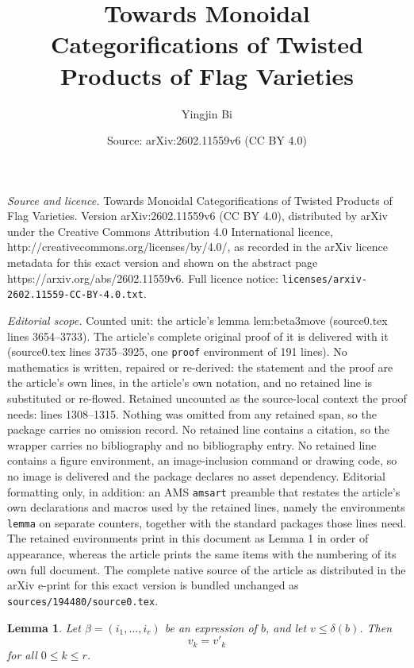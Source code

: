 \documentclass[10pt,a4paper]{amsart}
\title{Towards Monoidal Categorifications of Twisted Products of Flag Varieties}
\author{Yingjin Bi}
\date{Source: arXiv:2602.11559v6 (CC BY 4.0)}
\newtheorem{lemma}{Lemma}
\begin{document}
\maketitle

\noindent\emph{Source and licence.} Towards Monoidal Categorifications of Twisted Products of Flag Varieties. Version arXiv:2602.11559v6 (CC BY 4.0), distributed by arXiv under the Creative Commons Attribution 4.0 International licence, http://creativecommons.org/licenses/by/4.0/, as recorded in the arXiv licence metadata for this exact version and shown on the abstract page https://arxiv.org/abs/2602.11559v6. Full licence notice: \texttt{licenses/arxiv-2602.11559-CC-BY-4.0.txt}.\par\smallskip

\noindent\textit{Editorial scope.} Counted unit: the article's lemma lem:beta3move (source0.tex lines 3654--3733). The article's complete original proof of it is delivered with it (source0.tex lines 3735--3925, one \texttt{proof} environment of 191 lines). No mathematics is written, repaired or re-derived: the statement and the proof are the article's own lines, in the article's own notation, and no retained line is substituted or re-flowed.  Retained uncounted as the source-local context the proof needs: lines 1308--1315.  Nothing was omitted from any retained span, so the package carries no omission record.  No retained line contains a citation, so the wrapper carries no bibliography and no bibliography entry.  No retained line contains a figure environment, an image-inclusion command or drawing code, so no image is delivered and the package declares no asset dependency.  Editorial formatting only, in addition: an AMS \texttt{amsart} preamble that restates the article's own declarations and macros used by the retained lines, namely the environments \texttt{lemma} on separate counters, together with the standard packages those lines need.  The retained environments print in this document as Lemma 1 in order of appearance, whereas the article prints the same items with the numbering of its own full document.  The complete native source of the article as distributed in the arXiv e-print for this exact version is bundled unchanged as \texttt{sources/194480/source0.tex}.
\begin{lemma}\label{lem:vk}
Let \(\beta=(i_1,\dots,i_r)\) be an expression of \(b\), and let
\(v\le \delta(b)\). Then
\[
v_k=v'_k
\]
for all \(0\le k\le r\).
\end{lemma}
\end{document}
